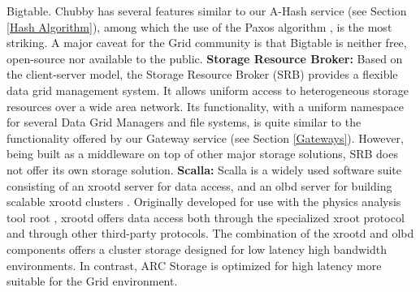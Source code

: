 \documentclass[final]{ieee}
\begin{document}
Bigtable. Chubby has several features similar to our A-Hash service (see Section \ref{Hash Algorithm}),
among which the use of the Paxos algorithm \cite{Paxos,PaxosLive}, is
the most striking. A major caveat for the Grid community is that
Bigtable is neither free, open-source nor available to the public.
\newline
\textbf{Storage Resource Broker:}  Based on the client-server model,
the Storage Resource Broker (SRB) \cite{earlySRB,SRB} provides a flexible data grid management
system. It allows  uniform access to heterogeneous
storage resources over a wide area network. %
Its functionality, with a uniform namespace for several Data Grid
Managers and file systems, is quite similar to the functionality
offered by our Gateway service (see Section \ref{Gateways}). However, being built as a middleware on top of
other major storage solutions, SRB does not offer its own storage solution.
\newline
\textbf{Scalla:} Scalla is a widely used software suite consisting of an
xrootd server for data access, and an olbd
server for building scalable xrootd clusters \cite{Scalla}. %
Originally developed for use with the physics analysis tool root \cite{root},
xrootd offers data access both through the specialized xroot protocol
and through other third-party protocols. The combination of the xrootd
and olbd components offers a cluster storage designed for low latency
high bandwidth environments. In contrast, ARC Storage is optimized
for high latency more suitable for the Grid environment.

\end{document}
